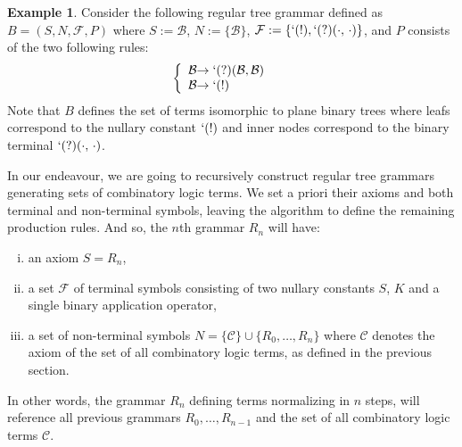 \documentclass[11pt,a4paper]{amsart}
\theoremstyle{definition}
\newtheorem{example}[theorem]{Example}
\begin{document}
\begin{example} 
Consider the following regular tree grammar defined as $B = (S,N,\mathcal{F},P)$ where
$S := \mathcal{B}$, $N := \{\mathcal{B}\}$, $\mathcal{F} := \{`(!), `(?)(\cdot,\,
\cdot)\}$, and $P$ consists of the two following rules: 
\begin{displaymath}
\left\{\begin{array}{r@{}l@{\qquad}l}
    \mathcal{B} &\to `(?)(\mathcal{B}, \mathcal{B})\\
    \mathcal{B} &\to `(!)
  \end{array}\right.
  \end{displaymath}
Note that $B$ defines the set of terms isomorphic to plane binary trees where
leafs correspond to the nullary constant $`(!)$ and inner nodes correspond to
the binary terminal $`(?)(\cdot,\, \cdot)$.
\end{example}

In our endeavour, we are going to recursively construct regular tree grammars
generating sets of combinatory logic terms. We set a priori their axioms and
both terminal and non-terminal symbols, leaving the algorithm to define the
remaining production rules. And so, the $n$th grammar $R_n$ will have:
\begin{enumerate}[(i)]
    \item an axiom $S = R_n$,
    \item a set $\mathcal{F}$ of terminal symbols consisting of two nullary
            constants $S$, $K$ and a single binary application operator,
    \item a set of non-terminal symbols $N = \{\mathcal{C}\} \cup
            \{R_0,\ldots,R_n\}$ where $\mathcal{C}$ denotes the axiom of the set
            of all combinatory logic terms, as defined in the previous section.
\end{enumerate}
In other words, the grammar $R_n$ defining terms normalizing in $n$ steps, will
reference all previous grammars $R_0,\ldots,R_{n-1}$ and the set of all
combinatory logic terms $\mathcal{C}$. 
\end{document}
